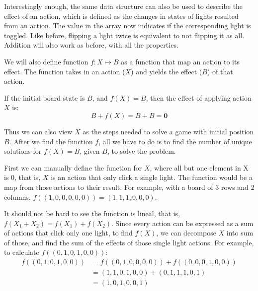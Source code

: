 \documentclass[a4paper, 12pt]{article}
\begin{document}
Interestingly enough, the same data structure can also be used to describe the effect of an action, which is defined as the changes in states of lights resulted from an action. The value in the array now indicates if the corresponding light is toggled. Like before, flipping a light twice is equivalent to not flipping it as all. Addition will also work as before, with all the properties.

We will also define function $f:X\mapsto B$ as a function that map an action to its effect. The function takes in an action ($X$) and yields the effect ($B$) of that action.

If the initial board state is $B$, and $f(X)=B$, then the effect of applying action $X$ is:
\[B+f(X)=B+B=\textbf{0}\]

Thus we can also view $X$ as the steps needed to solve a game with initial position $B$. After we find the function $f$, all we have to do is to find the number of unique solutions for $f(X)=B$, given $B$, to solve the problem.

First we can manually define the function for $X$, where all but one element in X is 0, that is, $X$ is an action that only click a single light. The function would be a map from those actions to their result. For example, with a board of 3 rows and 2 columns, $f((1, 0, 0, 0, 0, 0)) = (1, 1, 1, 0, 0, 0)$.

It should not be hard to see the function is lineal, that is, $f(X_1+X_2)=f(X_1)+f(X_2)$. Since every action can be expressed as a sum of actions that click only one light, to find $f(X)$, we can decompose $X$ into sum of those, and find the sum of the effects of those single light actions. For example, to calculate $f((0,1,0,1,0,0))$:
\[
\begin{split}
f((0,1,0,1,0,0)) & =f((0,1,0,0,0,0))+f((0,0,0,1,0,0))\\
& =(1,1,0,1,0,0)+(0,1,1,1,0,1)\\
& =(1,0,1,0,0,1)
\end{split}
\]
\end{document}
